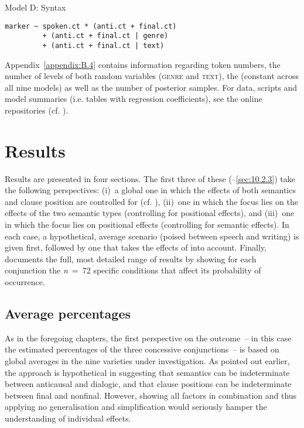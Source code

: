 \ea\label{bkm:Ref41508745}\label{eq:10.1}Model D: Syntax
\begin{lstlisting}
marker ~ spoken.ct * (anti.ct + final.ct)
         + (anti.ct + final.ct | genre)
         + (anti.ct + final.ct | text)
\end{lstlisting}
\z

Appendix~\ref{appendix:B.4} contains information regarding token numbers, the number of levels of both random variables (\textsc{genre} and \textsc{text}), the  (constant across all nine models) as well as the number of posterior samples. For data, scripts and model summaries (i.e. tables with regression coefficients), see the online repositories (cf. ).

\section{\label{bkm:Ref59515477}Results}\label{sec:10.2}

Results are presented in four sections. The first three of these (--\ref{sec:10.2.3}) take the following perspectives:
(i)~a global one in which the effects of both semantics and clause position are controlled for (cf. ),
(ii)~one in which the focus lies on the effects of the two semantic types (controlling for positional effects), and
(iii)~one in which the focus lies on positional effects (controlling for semantic effects). In each case, a hypothetical, average scenario (poised between speech and writing) is given first, followed by one that takes the effects of  into account. Finally,  documents the full, most detailed range of results by showing for each conjunction the \textit{n}~=~72 specific conditions that affect its probability of occurrence.

\subsection{\label{bkm:Ref59530971}\label{bkm:Ref59994510}\label{bkm:Ref60080151}\label{bkm:Ref60239585}\label{bkm:Ref60241218}\label{bkm:Ref60417331}Average percentages}\label{sec:10.2.1}

As in the foregoing chapters, the first perspective on the outcome~– in this case the estimated percentages of the three concessive conjunctions~– is based on global averages in the nine varieties under investigation. As pointed out earlier, the approach is hypothetical in suggesting that semantics can be indeterminate between anticausal and dialogic, and that clause positions can be indeterminate between final and nonfinal. However, showing all factors in combination and thus applying no generalisation and simplification would seriously hamper the understanding of individual effects.


